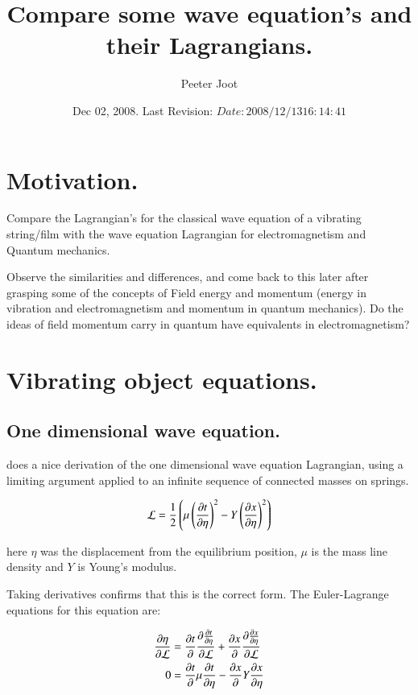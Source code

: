\documentclass{article}
\title{ Compare some wave equation's and their Lagrangians. }
\author{Peeter Joot}
\date{ Dec 02, 2008.  Last Revision: $Date: 2008/12/13 16:14:41 $ }
\begin{document}
\maketitle{}

\tableofcontents

\section{ Motivation. }

Compare the Lagrangian's for the classical wave equation of a vibrating string/film with the wave equation Lagrangian for electromagnetism and Quantum mechanics.

Observe the similarities and differences, and come back to this later after grasping some of the concepts of Field energy and momentum (energy in vibration and electromagnetism and momentum in quantum mechanics).  Do the ideas of field momentum carry in quantum have equivalents in electromagnetism?

\section{ Vibrating object equations. }

\subsection{ One dimensional wave equation. }

\cite{goldstein1951cm} does a nice derivation of the one dimensional wave
equation Lagrangian, using a limiting argument applied to an infinite
sequence of connected masses on springs.

\begin{align}\label{eqn:oneDimensionalWaveLagrangian}
\mathcal{L} = \frac{1}{2} \left(\mu \left(\frac{\partial{t}}{\partial {\eta}}\right)^2 - Y \left(\frac{\partial{x}}{\partial {\eta}}\right)^2 \right)
\end{align}

here $\eta$ was the displacement from the equilibrium position, $\mu$ is the mass line density and $Y$ is Young's modulus.

Taking derivatives confirms that this is the correct form.  The Euler-Lagrange
equations for this equation are:

\begin{align*}
\frac{\partial{\eta}}{\partial {\mathcal{L}}} &= \frac{\partial{t}}{\partial {}} \frac{\partial{ \frac{\partial{t}}{\partial {\eta}} }}{\partial {\mathcal{L}}} +\frac{\partial{x}}{\partial {}} \frac{\partial{ \frac{\partial{x}}{\partial {\eta}} }}{\partial {\mathcal{L}}} \\
0 &= \frac{\partial{t}}{\partial {}} \mu \frac{\partial{t}}{\partial {\eta}} -\frac{\partial{x}}{\partial {}} Y \frac{\partial{x}}{\partial {\eta}} \\
\end{align*}
\end{document}
